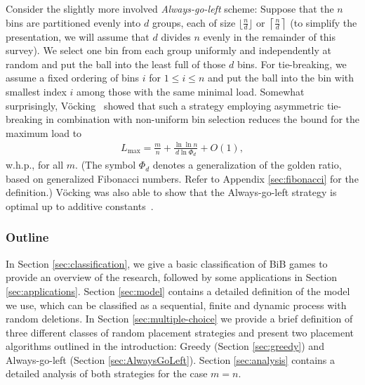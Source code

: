 \documentclass[a4paper,12pt]{article}
\newcommand\load{L_{\mathrm{max}}}
\begin{document}
Consider the slightly more involved \emph{Always-go-left} scheme: Suppose that the $n$ bins are partitioned evenly into $d$ groups, each of size $\lfloor \frac{n}{d}\rfloor$ or $\left\lceil\frac{n}{d}\right\rceil$ (to simplify the presentation, we will assume that $d$ divides $n$ evenly in the remainder of this survey). We select one bin from each group uniformly and independently at random and put the ball into the least full of those $d$ bins. For tie-breaking, we assume a fixed ordering of bins $i$ for $1 \leq i \leq n$ and put the ball into the bin with smallest index $i$ among those with the same minimal load. Somewhat surprisingly, V\"ocking~\cite{VOC03} showed that such a strategy employing asymmetric tie-breaking in combination with non-uniform bin selection reduces the bound for the maximum load to
\begin{align*}
\load = \frac{m}{n} + \frac{\ln\ln n}{d  \ln \Phi_d} + O(1),
\end{align*}
w.h.p., for all $m$. (The symbol $\Phi_d$ denotes a generalization of the golden ratio, based on generalized Fibonacci numbers. Refer to Appendix \ref{sec:fibonacci} for the definition.) V\"ocking was also able to show that the Always-go-left strategy is optimal up to additive constants~\cite{VOC03}.

\subsubsection*{Outline}
In Section \ref{sec:classification}, we give a basic classification of BiB games to provide an overview of the research, followed by some applications in Section \ref{sec:applications}. Section \ref{sec:model} contains a detailed definition of the model we use, which can be classified as a sequential, finite and dynamic process with random deletions. In Section \ref{sec:multiple-choice} we provide a brief definition of three different classes of random placement strategies and present two placement algorithms outlined in the introduction: Greedy (Section \ref{sec:greedy}) and Always-go-left (Section \ref{sec:AlwaysGoLeft}). Section \ref{sec:analysis} contains a detailed analysis of both strategies for the case $m=n$. 
\end{document}
